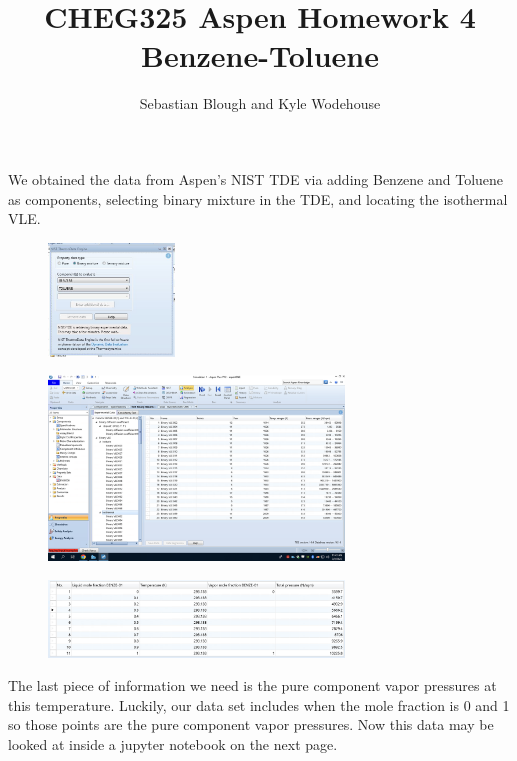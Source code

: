 \documentclass{article}
\title{\bfseries CHEG325 Aspen Homework 4 Benzene-Toluene}
\author{Sebastian Blough and Kyle Wodehouse}
\date{}
\begin{document}
\maketitle
\noindent
We obtained the data from Aspen's NIST TDE via adding Benzene and Toluene as components, selecting binary mixture in the TDE, and locating the isothermal VLE.
\begin{figure}[H]
    \centering
    \includegraphics[width=0.3\textwidth, frame]{img/1.JPG}
\end{figure}

\begin{figure}[H]
    \centering
    \includegraphics[width=0.7\textwidth, frame]{img/2.png}
\end{figure}

\begin{figure}[H]
    \centering
    \includegraphics[width=0.7\textwidth, frame]{img/3.png}
\end{figure}

The last piece of information we need is the pure component vapor pressures at this temperature. Luckily, our data set includes when the mole fraction is 0 and 1 so those points are the pure component vapor pressures. Now this data may be looked at inside a jupyter notebook on the next page.
\end{document}
